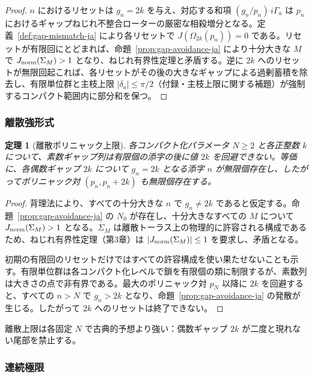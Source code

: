 \documentclass[dvipdfmx,a4paper]{article}
\newtheorem{theorem}{定理}[section]
\theoremstyle{definition}
\theoremstyle{remark}
\newcommand{\Jnorm}{J_{\rm norm}}
\begin{document}
\begin{proof}
$n$ におけるリセットは $g_n = 2k$ を与え、対応する和項 $(g_n/p_n)\, i\Gamma_a$ は $p_n$ におけるギャップねじれ不整合ローターの厳密な相殺増分となる。定義~\ref{def:gap-mismatch-ja} により各リセットで $J(\Omega_{2k}(p_n)) = 0$ である。リセットが有限回にとどまれば、命題~\ref{prop:gap-avoidance-ja} により十分大きな $M$ で $\Jnorm(\Sigma_M) > 1$ となり、ねじれ有界性定理と矛盾する。逆に $2k$ へのリセットが無限回起これば、各リセットがその後の大きなギャップによる過剰蓄積を除去し、有限単位群と主枝上限 $|\delta_a| \leq \pi/2$（付録・主枝上限に関する補題）が強制するコンパクト範囲内に部分和を保つ。
\end{proof}

\subsubsection{離散強形式}

\begin{theorem}[離散ポリニャック上限]
\label{thm:discrete-polignac-ja}
各コンパクト化パラメータ $N \geq 2$ と各正整数 $k$ について、素数ギャップ列は有限個の添字の後に値 $2k$ を回避できない。等価に、各偶数ギャップ $2k$ について $g_n = 2k$ となる添字 $n$ が無限個存在し、したがってポリニャック対 $(p_n, p_n + 2k)$ も無限個存在する。
\end{theorem}

\begin{proof}
背理法により、すべての十分大きな $n$ で $g_n \neq 2k$ であると仮定する。命題~\ref{prop:gap-avoidance-ja} の $N_0$ が存在し、十分大きなすべての $M$ について $\Jnorm(\Sigma_M) > 1$ となる。$\Sigma_M$ は離散トーラス上の物理的に許容される構成であるため、ねじれ有界性定理（第3章）は $|\Jnorm(\Sigma_M)| \leq 1$ を要求し、矛盾となる。

初期の有限回のリセットだけではすべての許容構成を使い果たせないことも示す。有限単位群は各コンパクト化レベルで鎖を有限個の類に制限するが、素数列は大きさの点で非有界である。最大のポリニャック対 $p_N$ 以降に $2k$ を回避すると、すべての $n > N$ で $g_n > 2k$ となり、命題~\ref{prop:gap-avoidance-ja} の発散が生じる。したがって $2k$ へのリセットは終了できない。
\end{proof}

離散上限は各固定 $N$ で古典的予想より強い：偶数ギャップ $2k$ が二度と現れない尾部を禁止する。

\subsubsection{連続極限}
\end{document}
